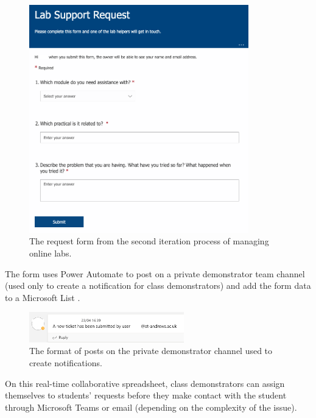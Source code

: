 \FloatBarrier
\begin{figure}[H]
  \centering
  \includegraphics[width=0.85\textwidth]{2context/images/teams2a.png}
  \caption{The request form from the second iteration process of managing online labs.}
\end{figure}

The form uses Power Automate \cite{pauto} to post on a private demonstrator team channel (used only to create a notification for class demonstrators) and add the form data to a Microsoft List \cite{lists}.

\FloatBarrier
\begin{figure}[H]
  \centering
  \includegraphics[width=0.6\textwidth]{2context/images/teams2b.png}
  \caption{The format of posts on the private demonstrator channel used to create notifications.}
\end{figure}

On this real-time collaborative spreadsheet, class demonstrators can assign themselves to students' requests before they make contact with the student through Microsoft Teams \cite{teams} or email (depending on the complexity of the issue). 


